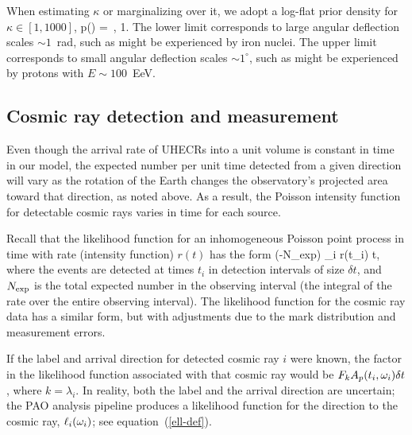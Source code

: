 When estimating $\kappa$ or marginalizing over it, we adopt a log-flat prior
density for $\kappa\in[1,1000]$,
\be
p(\kappa) = \,,  1\leq\kappa{}.
\label{k-prior}
\ee
The lower limit corresponds to large angular deflection scales $\sim 1$~rad,
such as might be experienced by iron nuclei.  The upper limit corresponds
to small angular deflection scales $\sim 1^\circ$, such as might be
experienced by protons with $E\sim 100$~EeV.


\subsection{Cosmic ray detection and measurement}
\label{sec:dtxn}

Even though the arrival rate of UHECRs into a unit volume is constant in
time in our model, the expected number per unit time detected from a given
direction will vary as the rotation of the Earth changes the observatory's
projected area toward that direction, as noted above.  As a result, the
Poisson intensity function for detectable cosmic rays varies in
time for each source.

Recall that the likelihood function for an inhomogeneous Poisson
point process in time with rate (intensity function) $r(t)$ has the form
\be
\exp(-N_{\rm exp}) \prod_i r(t_i) \delta t,
\label{simple-ppp-like}
\ee
where the events are detected at times $t_i$ in detection intervals of size
$\delta t$, and $N_{\rm exp}$ is the total expected number in the observing
interval (the integral of the rate over the entire observing interval).
The likelihood function for the cosmic ray data has a similar form, but
with adjustments due to the mark distribution and measurement errors.

If the label and arrival direction for detected cosmic ray $i$ were known, the
factor in the likelihood function associated with that cosmic ray would be
$F_k A_p(t_i, \omega_i) \delta t$, where $k=\lambda_i$.
In reality, both the label and the arrival direction are uncertain; the PAO
analysis pipeline produces a likelihood function for the direction to the
cosmic ray, $\ell_i(\omega_i)$; see equation~(\ref{ell-def}).

